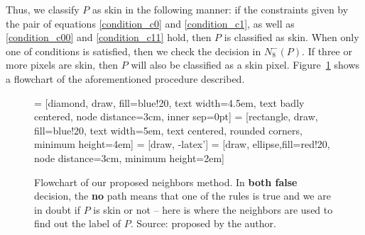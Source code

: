 Thus, we classify $P$ as skin in the following manner: if the constraints given by the pair of equations \ref{condition_c0} and \ref{condition_c1}, as well as \ref{condition_c00} and \ref{condition_c11} hold, then $P$ is classified as skin. When only one of conditions is satisfied, then we check the decision in $N_8^-(P)$. If three or more pixels are skin, then $P$ will also be classified as a skin pixel. Figure~\ref{fig:n8-flowchart} shows a flowchart of the aforementioned procedure described.

\begin{figure}[ht]
    \centering

     = [diamond, draw, fill=blue!20, 
        text width=4.5em, text badly centered, node distance=3cm, inner sep=0pt]
     = [rectangle, draw, fill=blue!20, 
        text width=5em, text centered, rounded corners, minimum height=4em]
     = [draw, -latex']
     = [draw, ellipse,fill=red!20, node distance=3cm,
        minimum height=2em]
        
    
    \caption[Flowchart of our proposed neighbors method]{Flowchart of our proposed neighbors method. In \textbf{both false} decision, the \textbf{no} path means that one of the rules is true and we are in doubt if $P$ is skin or not -- here is where the neighbors are used to find out the label of $P$. Source: proposed by the author.}
    \label{fig:n8-flowchart}
\end{figure}


